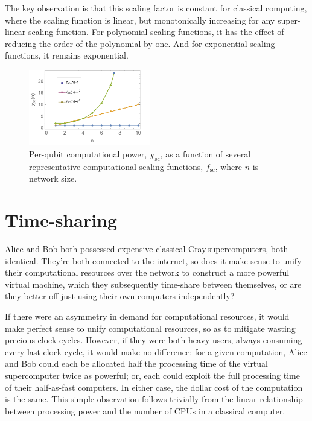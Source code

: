 The key observation is that this scaling factor is constant for classical computing, where the scaling function is linear, but monotonically increasing for any super-linear scaling function. For polynomial scaling functions, it has the effect of reducing the order of the polynomial by one. And for exponential scaling functions, it remains exponential.

\begin{figure}[htb!]
	\includegraphics[clip=true, width=0.475\textwidth]{network_price_scaling_factor}
	\captionspacefig \caption{Per-qubit computational power, $\chi_\mathrm{sc}$, as a function of several representative computational scaling functions, $f_\mathrm{sc}$, where $n$ is network size.} \label{fig:NPSF}
\end{figure}

%
%

\section{Time-sharing}\label{sec:time_share}

 Alice and Bob both possessed expensive classical Cray\texttrademark\,supercomputers, both identical. They're both connected to the internet, so does it make sense to unify their computational resources over the network to construct a more powerful virtual machine, which they subsequently time-share between themselves, or are they better off just using their own computers independently?

If there were an asymmetry in demand for computational resources, it would make perfect sense to unify computational resources, so as to mitigate wasting precious clock-cycles. However, if they were both heavy users, always consuming every last clock-cycle, it would make no difference: for a given computation, Alice and Bob could each be allocated half the processing time of the virtual supercomputer twice as powerful; or, each could exploit the full processing time of their half-as-fast computers. In either case, the dollar cost of the computation is the same. This simple observation follows trivially from the linear relationship between processing power and the number of CPUs in a classical computer.

